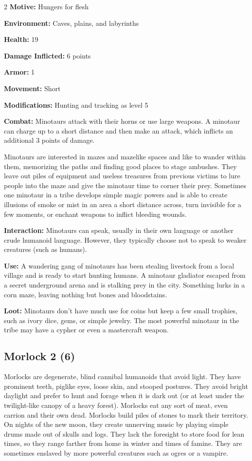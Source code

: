 \begin{multicols}{2}
\textbf{Motive:} Hungers for flesh 

\textbf{Environment:} Caves, plains, and labyrinths 

\textbf{Health:} 19 

\textbf{Damage Inflicted:} 6 points 

\textbf{Armor:} 1 

\textbf{Movement:} Short 

\textbf{Modifications:} Hunting and tracking as level 5 

\textbf{Combat:} Minotaurs attack with their horns or use large weapons. A minotaur can charge up to a short distance and then make an attack, which inflicts an additional 3 points of damage. 

Minotaurs are interested in mazes and mazelike spaces and like to wander within them, memorizing the paths and finding good places to stage ambushes. They leave out piles of equipment and useless treasures from previous victims to lure people into the maze and give the minotaur time to corner their prey. Sometimes one minotaur in a tribe develops simple magic powers and is able to create illusions of smoke or mist in an area a short distance across, turn invisible for a few moments, or enchant weapons to inflict bleeding wounds. 

\textbf{Interaction:} Minotaurs can speak, usually in their own language or another crude humanoid language. However, they typically choose not to speak to weaker creatures (such as humans). 

\textbf{Use:} A wandering gang of minotaurs has been stealing livestock from a local village and is ready to start hunting humans. A minotaur gladiator escaped from a secret underground arena and is stalking prey in the city. Something lurks in a corn maze, leaving nothing but bones and bloodstains. 

\textbf{Loot:} Minotaurs don’t have much use for coins but keep a few small trophies, such as ivory dice, gems, or simple jewelry. The most powerful minotaur in the tribe may have a cypher or even a mastercraft weapon.

\subsection{Morlock 2 (6)}

Morlocks are degenerate, blind cannibal humanoids that avoid light. They have prominent teeth, piglike eyes, loose skin, and stooped postures. They avoid bright daylight and prefer to hunt and forage when it is dark out (or at least under the twilight-like canopy of a heavy forest). Morlocks eat any sort of meat, even carrion and their own dead. Morlocks build piles of stones to mark their territory. On nights of the new moon, they create unnerving music by playing simple drums made out of skulls and logs. They lack the foresight to store food for lean times, so they range farther from home in winter and times of famine. They are sometimes enslaved by more powerful creatures such as ogres or a vampire. 


\end{multicols}
